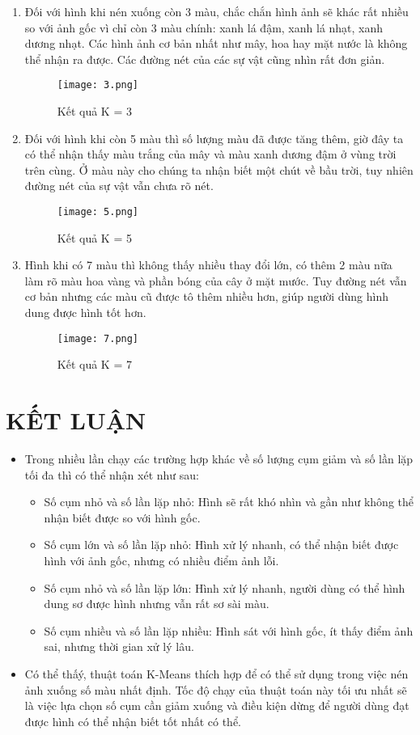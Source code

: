 \documentclass{report}
\begin{document}
\begin{enumerate}
\newpage
\item Đối với hình khi nén xuống còn 3 màu, chắc chắn hình ảnh sẽ khác rất nhiều so với ảnh gốc vì chỉ còn 3 màu chính: xanh lá đậm, xanh lá nhạt, xanh dương nhạt. Các hình ảnh cơ bản nhất như mây, hoa hay mặt nước là không thể nhận ra được. Các đường nét của các sự vật cũng nhìn rất đơn giản.
\begin{figure}[!h]
    \centering
    \texttt{[image: 3.png]}
    \caption{Kết quả K = 3}
\end{figure}

\newpage
\item Đối với hình khi còn 5 màu thì số lượng màu đã được tăng thêm, giờ đây ta có thể nhận thấy màu trắng của mây và màu xanh dương đậm ở vùng trời trên cùng. Ở màu này cho chúng ta nhận biết một chút về bầu trời, tuy nhiên đường nét của sự vật vẫn chưa rõ nét.
\begin{figure}[!h]
    \centering
    \texttt{[image: 5.png]}
    \caption{Kết quả K = 5}
\end{figure}

\newpage
\item Hình khi có 7 màu thì không thấy nhiều thay đổi lớn, có thêm 2 màu nữa làm rõ màu hoa vàng và phần bóng của cây ở mặt mước. Tuy đường nét vẫn cơ bản nhưng các màu cũ được tô thêm nhiều hơn, giúp người dùng hình dung được hình tốt hơn.
\begin{figure}[!h]
    \centering
    \texttt{[image: 7.png]}
    \caption{Kết quả K = 7}
\end{figure}
\end{enumerate}

\section{KẾT LUẬN}
\begin{itemize}
    \item Trong nhiều lần chạy các trường hợp khác về số lượng cụm giảm và số lần lặp tối đa thì có thể nhận xét như sau:
    \begin{itemize}
        \item Số cụm nhỏ và số lần lặp nhỏ: Hình sẽ rất khó nhìn và gần như không thể nhận biết được so với hình gốc.
        \item  Số cụm lớn và số lần lặp nhỏ: Hình xử lý nhanh, có thể nhận biết được hình với ảnh gốc, nhưng có nhiều điểm ảnh lỗi.
        \item Số cụm nhỏ và số lần lặp lớn: Hình xử lý nhanh, người dùng có thể hình dung sơ được hình nhưng vẫn rất sơ sài màu.
        \item  Số cụm nhiều và số lần lặp nhiều: Hình sát với hình gốc, ít thấy điểm ảnh sai, nhưng thời gian xử lý lâu.
        \end{itemize}
    \item Có thể thấý, thuật toán K-Means thích hợp để có thể sử dụng trong việc nén ảnh xuống số màu nhất định. Tốc độ chạy của thuật toán này tối ưu nhất sẽ là việc lựa chọn số cụm cần giảm xuống và điều kiện dừng để người dùng đạt được hình có thể nhận biết tốt nhất có thể.
    
\end{itemize}
\end{document}
